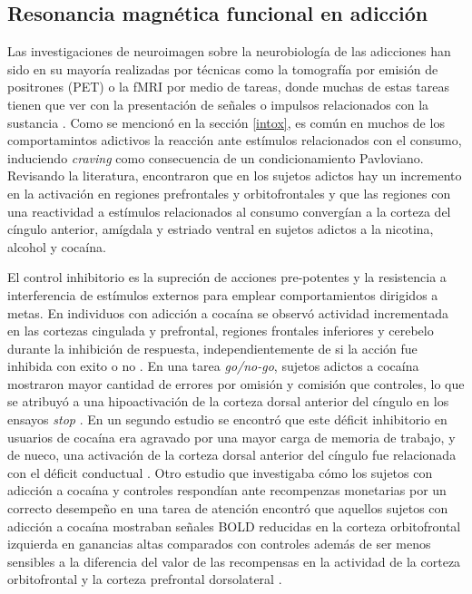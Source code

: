 \subsection{Resonancia magnética funcional en adicción}
Las investigaciones de neuroimagen sobre la neurobiología de las adicciones han sido en su mayoría realizadas por técnicas como la tomografía por emisión de positrones (PET) o la fMRI por medio de tareas, donde muchas de estas tareas tienen que ver con la presentación de señales o impulsos relacionados con la sustancia \parencite{Jasinska2014}.
Como se mencionó en la sección \ref{intox}, es común en muchos de los comportamintos adictivos la reacción ante estímulos relacionados con el consumo, induciendo \textit{craving} como consecuencia de un condicionamiento Pavloviano. Revisando la literatura, \textcite{Suckling2017} encontraron que en los sujetos adictos hay un incremento en la activación en regiones prefrontales y orbitofrontales y que las regiones con una reactividad a estímulos relacionados al consumo convergían a la corteza del cíngulo anterior, amígdala y estriado ventral en sujetos adictos a la nicotina, alcohol y cocaína. \par
El control inhibitorio es la supreción de acciones pre-potentes y la resistencia a interferencia de estímulos externos para emplear comportamientos dirigidos a metas.
En individuos con adicción a cocaína se observó actividad incrementada en las cortezas cingulada y prefrontal, regiones frontales inferiores y cerebelo durante la inhibición de respuesta, independientemente de si la acción fue inhibida con exito o no \parencite{Suckling2017}.
En una tarea \textit{go/no-go}, sujetos adictos a cocaína mostraron mayor cantidad de errores por omisión y comisión que controles, lo que se atribuyó a una hipoactivación de la corteza dorsal anterior del cíngulo en los ensayos \textit{stop} \parencite{Kaufman2003}.
En un segundo estudio se encontró que este déficit inhibitorio en usuarios de cocaína era agravado por una mayor carga de memoria de trabajo, y de nueco, una activación de la corteza dorsal anterior del cíngulo fue relacionada con el déficit conductual \parencite{Hester2004}.
Otro estudio que investigaba cómo los sujetos con adicción a cocaína y controles respondían ante recompenzas monetarias por un correcto desempeño en una tarea de atención encontró que aquellos sujetos con adicción a cocaína mostraban señales BOLD reducidas en la corteza orbitofrontal izquierda en ganancias altas comparados con controles además de ser menos sensibles a la diferencia del valor de las recompensas en la actividad de la corteza orbitofrontal y la corteza prefrontal dorsolateral \parencite{Goldstein2007}. \par
